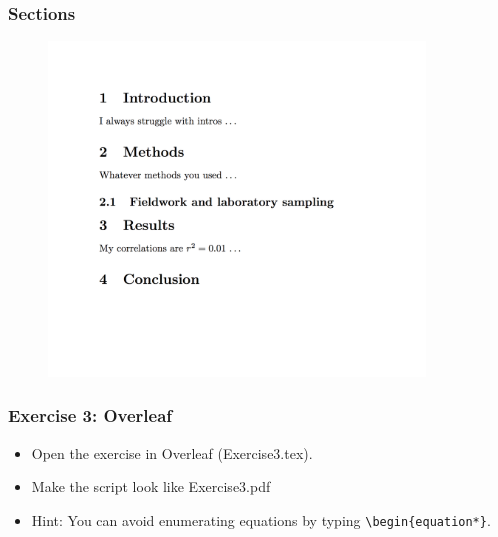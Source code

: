 \documentclass{beamer}
\begin{document}
\begin{frame}[fragile]
\frametitle{Sections}
\begin{figure}
\includegraphics[width=100mm]{figures/example_2.png}
\end{figure}
\end{frame}


\begin{frame}[fragile]
\frametitle{Exercise 3: Overleaf}
\begin{itemize}
\item Open the exercise in Overleaf (Exercise3.tex).
\item Make the script look like Exercise3.pdf
\item  Hint: You can avoid enumerating equations by typing \verb|\begin{equation*}|.
\end{itemize}
\end{frame}
\end{document}
